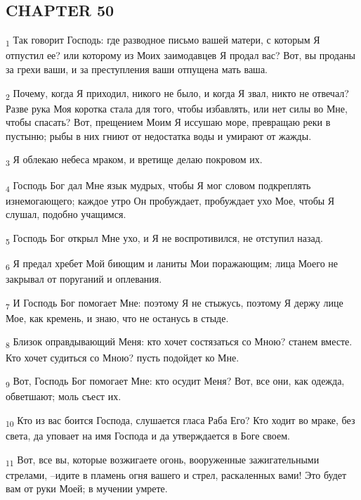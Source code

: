 \subsection{CHAPTER 50}
\begin{tcolorbox}
\textsubscript{1} Так говорит Господь: где разводное письмо вашей матери, с которым Я отпустил ее? или которому из Моих заимодавцев Я продал вас? Вот, вы проданы за грехи ваши, и за преступления ваши отпущена мать ваша.
\end{tcolorbox}
\begin{tcolorbox}
\textsubscript{2} Почему, когда Я приходил, никого не было, и когда Я звал, никто не отвечал? Разве рука Моя коротка стала для того, чтобы избавлять, или нет силы во Мне, чтобы спасать? Вот, прещением Моим Я иссушаю море, превращаю реки в пустыню; рыбы в них гниют от недостатка воды и умирают от жажды.
\end{tcolorbox}
\begin{tcolorbox}
\textsubscript{3} Я облекаю небеса мраком, и вретище делаю покровом их.
\end{tcolorbox}
\begin{tcolorbox}
\textsubscript{4} Господь Бог дал Мне язык мудрых, чтобы Я мог словом подкреплять изнемогающего; каждое утро Он пробуждает, пробуждает ухо Мое, чтобы Я слушал, подобно учащимся.
\end{tcolorbox}
\begin{tcolorbox}
\textsubscript{5} Господь Бог открыл Мне ухо, и Я не воспротивился, не отступил назад.
\end{tcolorbox}
\begin{tcolorbox}
\textsubscript{6} Я предал хребет Мой биющим и ланиты Мои поражающим; лица Моего не закрывал от поруганий и оплевания.
\end{tcolorbox}
\begin{tcolorbox}
\textsubscript{7} И Господь Бог помогает Мне: поэтому Я не стыжусь, поэтому Я держу лице Мое, как кремень, и знаю, что не останусь в стыде.
\end{tcolorbox}
\begin{tcolorbox}
\textsubscript{8} Близок оправдывающий Меня: кто хочет состязаться со Мною? станем вместе. Кто хочет судиться со Мною? пусть подойдет ко Мне.
\end{tcolorbox}
\begin{tcolorbox}
\textsubscript{9} Вот, Господь Бог помогает Мне: кто осудит Меня? Вот, все они, как одежда, обветшают; моль съест их.
\end{tcolorbox}
\begin{tcolorbox}
\textsubscript{10} Кто из вас боится Господа, слушается гласа Раба Его? Кто ходит во мраке, без света, да уповает на имя Господа и да утверждается в Боге своем.
\end{tcolorbox}
\begin{tcolorbox}
\textsubscript{11} Вот, все вы, которые возжигаете огонь, вооруженные зажигательными стрелами, --идите в пламень огня вашего и стрел, раскаленных вами! Это будет вам от руки Моей; в мучении умрете.
\end{tcolorbox}
